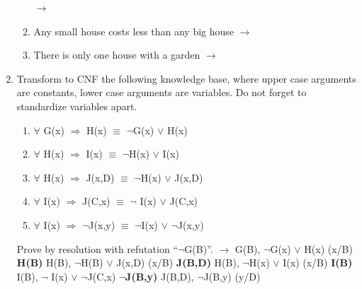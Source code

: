 \documentclass[10pt]{article}
\begin{document}
\begin{enumerate}
\begin{enumerate}
            $\rightarrow$ 
            \item Any small house costs less than any big house \newline
            $\rightarrow$ 
            \item There is only one house with a garden \newline
            $\rightarrow$ 
    	\end{enumerate}
	\item Transform to CNF the following knowledge base, where upper case arguments are constants, lower case arguments are variables. Do not forget to standardize variables apart.
    	\begin{enumerate}
    		\item $\forall$ G(x) $\Rightarrow$ H(x) $\equiv$ $\neg$G(x) $\vee$ H(x)
            \item $\forall$ H(x) $\Rightarrow$ I(x) $\equiv$ $\neg$H(x) $\vee$ I(x)
            \item $\forall$ H(x) $\Rightarrow$ J(x,D) $\equiv$ $\neg$H(x) $\vee$ J(x,D)
            \item $\forall$ I(x) $\Rightarrow$ J(C,x) $\equiv$ $\neg$ I(x) $\vee$ J(C,x)
            \item $\forall$ I(x) $\Rightarrow$ $\neg$J(x,y) $\equiv$ $\neg$I(x) $\vee$ $\neg$J(x,y)
    	\end{enumerate}
	Prove by resolution with refutation \enquote{$\neg$G(B)}. \newline
    $\rightarrow$ \newline
    G(B), $\neg$G(x) $\vee$ H(x) (x/B) \newline
    \textbf{H(B)} \newline
    H(B), $\neg$H(B) $\vee$ J(x,D) (x/B) \newline 
    \textbf{J(B,D)} \newline
    H(B), $\neg$H(x) $\vee$ I(x) (x/B) \newline
    \textbf{I(B)} \newline
    I(B), $\neg$ I(x) $\vee$ $\neg$J(C,x) \newline
    \textbf{$\neg$J(B,y)} \newline
    J(B,D), $\neg$J(B,y) (y/D) \newline

\end{enumerate}
\end{document}
